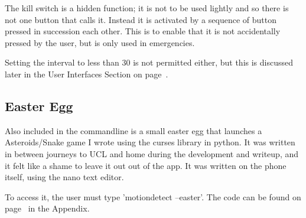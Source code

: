 The kill switch is a hidden function; it is not to be used lightly and so there is not one button that calls it. Instead it is activated by a sequence of button pressed in succession each other. This is to enable that it is not accidentally pressed by the user, but is only used in emergencies.

Setting the interval to less than 30 is not permitted either, but this is discussed later in the User Interfaces Section on page~\pageref{userinterfaces}.

\subsection{Easter Egg}
Also included in the commandline is a small easter egg that launches a Asteroids/Snake game I wrote using the curses library in python. It was written in between journeys to UCL and home during the development and writeup, and it felt like a shame to leave it out out of the app.
It was written on the phone itself, using the nano text editor.

To access it, the user must type 'motiondetect --easter'. The code can be found on page~\pageref{easter} in the Appendix.


%